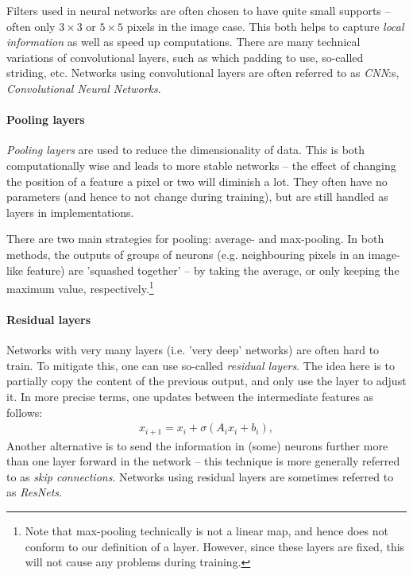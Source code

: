 \documentclass{article}
\begin{document}
Filters used in neural networks are often chosen to have quite small supports -- often only $3\times 3$ or $5 \times 5$ pixels in the image case. This both helps to capture \emph{local information} as well as speed up computations. There are many technical variations of convolutional layers, such as which padding to use, so-called striding, etc. Networks using convolutional layers are often referred to as \emph{CNN}:s, \emph{Convolutional Neural Networks}.





\paragraph{Pooling layers} \emph{Pooling layers} are used to reduce the dimensionality of data. This is both computationally wise and leads to more stable networks -- the effect of changing the position of a feature a pixel or two will diminish a lot. They often have no parameters (and hence to not change during training), but are still handled as layers in implementations.

There are two main strategies for pooling: average- and max-pooling. In both methods, the outputs of groups of neurons (e.g. neighbouring pixels in an image-like feature) are 'squashed together' -- by taking the average, or only keeping the maximum value, respectively.\footnote{Note that max-pooling technically is not a linear map, and hence does not conform to our definition of a layer. However, since these layers are fixed, this will not cause any problems during training.} 



\paragraph{Residual layers} Networks with very many layers (i.e. 'very deep' networks) are often hard to train. To mitigate this, one can use so-called \emph{residual layers}. The idea here is to partially copy the content of the previous output, and only use the layer to adjust it. In more precise terms, one updates between the intermediate features as follows:
\begin{align*}
    x_{i+1} =  x_i + \sigma(A_ix_i + b_i),
\end{align*}
Another alternative is to send the information in (some) neurons further more than one layer forward in the network -- this technique is more generally referred to as \emph{skip connections}. Networks using residual layers are sometimes referred to as \emph{ResNets}. 
\end{document}
